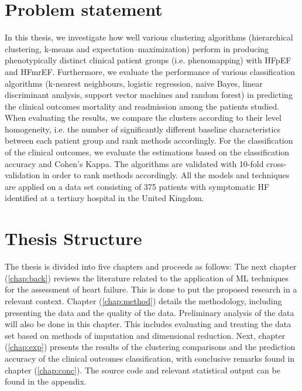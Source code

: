\documentclass[../thesis.tex]{subfiles}
\begin{document}
\section{Problem statement}
\label{sec:prob_stat}

\noindent In this thesis, we investigate how well various clustering algorithms (hierarchical clustering, k-means and expectation–maximization) perform in producing phenotypically distinct clinical patient groups (i.e. phenomapping) with HFpEF and HFmrEF. Furthermore, we evaluate the performance of various classification algorithms (k-nearest neighbours, logistic regression, naive Bayes, linear discriminant analysis, support vector machines and random forest) in predicting the clinical outcomes mortality and readmission among the patients studied. When evaluating the results, we compare the clusters according to their level homogeneity, i.e. the number of significantly different baseline characteristics between each patient group and rank methods accordingly. For the classification of the clinical outcomes, we evaluate the estimations based on the classification accuracy and Cohen's Kappa. The algorithms are validated with 10-fold cross-validation in order to rank methods accordingly. All the models and techniques are applied on a data set consisting of 375 patients with symptomatic HF identified at a tertiary hospital in the United Kingdom.  

\section{Thesis Structure}
\label{sec:thesis_struc}

\noindent The thesis is divided into five chapters and proceeds as follows: The next chapter (\ref{chap:back}) reviews the literature related to the application of ML techniques for the assessment of heart failure. This is done to put the proposed research in a relevant context. Chapter (\ref{chap:method}) details the methodology, including presenting the data and the quality of the data. Preliminary analysis of the data will also be done in this chapter. This includes evaluating and treating the data set based on methods of imputation and dimensional reduction. Next, chapter (\ref{chap:exp}) presents the results of the clustering comparisons and the prediction accuracy of the clinical outcomes classification, with conclusive remarks found in chapter (\ref{chap:conc}). The source code and relevant statistical output can be found in the appendix.
\end{document}
